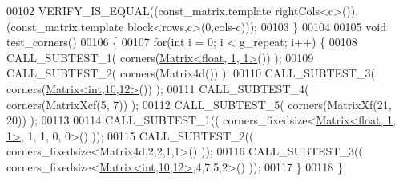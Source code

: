 \begin{DoxyCode}
00102   VERIFY\_IS\_EQUAL((const\_matrix.template rightCols<c>()), (const\_matrix.template block<rows,c>(0,cols-c)));
00103 \}
00104 
00105 \textcolor{keywordtype}{void} test\_corners()
00106 \{
00107   \textcolor{keywordflow}{for}(\textcolor{keywordtype}{int} i = 0; i < g\_repeat; i++) \{
00108     CALL\_SUBTEST\_1( corners(\hyperlink{group___core___module_class_eigen_1_1_matrix}{Matrix<float, 1, 1>}()) );
00109     CALL\_SUBTEST\_2( corners(Matrix4d()) );
00110     CALL\_SUBTEST\_3( corners(\hyperlink{group___core___module_class_eigen_1_1_matrix}{Matrix<int,10,12>}()) );
00111     CALL\_SUBTEST\_4( corners(MatrixXcf(5, 7)) );
00112     CALL\_SUBTEST\_5( corners(MatrixXf(21, 20)) );
00113 
00114     CALL\_SUBTEST\_1(( corners\_fixedsize<\hyperlink{group___core___module_class_eigen_1_1_matrix}{Matrix<float, 1, 1>}, 1, 1, 0, 0>() ));
00115     CALL\_SUBTEST\_2(( corners\_fixedsize<Matrix4d,2,2,1,1>() ));
00116     CALL\_SUBTEST\_3(( corners\_fixedsize<\hyperlink{group___core___module_class_eigen_1_1_matrix}{Matrix<int,10,12>},4,7,5,2>() ));
00117   \}
00118 \}
\end{DoxyCode}

